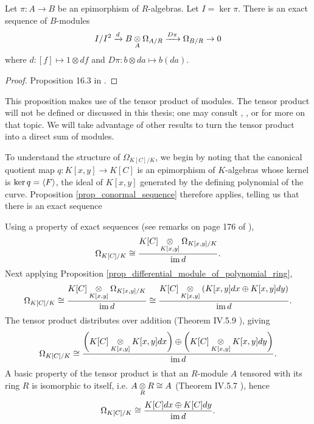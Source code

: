 \begin{proposition}
  \label{prop_conormal_sequence}
  Let $\pi : A \to B$ be an epimorphism of $R$-algebras.
  Let $I = \ker \pi$.
  There is an exact sequence of $B$-modules
    \[ I/I^2 \xrightarrow{d} B \underset{A}{\otimes} \Omega_{A/R} \xrightarrow{D\pi} \Omega_{B/R} \to 0 \]
  where $d : [f] \mapsto 1 \otimes df$ and $D\pi : b \otimes da \mapsto b(da)$.
\end{proposition}
\begin{proof}
  Proposition 16.3 in \cite{eisenbud95}.
\end{proof}

This proposition makes use of the tensor product of modules.
The tensor product will not be defined or discussed in this thesis;
one may consult \cite{dummit04}, \cite{eisenbud95}, or \cite{hungerford} for more on that topic.
We will take advantage of other results to turn the tensor product into a direct sum of modules.

To understand the structure of $\Omega_{K[C]/K}$,
we begin by noting that the canonical quotient map $q : K[x,y] \to K[C]$ is an epimorphism of $K$-algebras
whose kernel is $\ker q = \left\langle F \right\rangle$, the ideal of $K[x,y]$ generated by the defining polynomial of the curve.
Proposition \ref{prop_conormal_sequence} therefore applies, telling us that there is an exact sequence
\begin{center}
\end{center}
Using a property of exact sequences (see remarks on page 176 of \cite{hungerford}), 
\[ \Omega_{K[C]/K} \cong \frac {K[C] \underset{K[x,y]}{\otimes} \Omega_{K[x,y]/K}} {\operatorname{im} d}. \]
Next applying Proposition \ref{prop_differential_module_of_polynomial_ring},
\[ \Omega_{K[C]/K} \cong \frac {K[C] \underset{K[x,y]}{\otimes} \Omega_{K[x,y]/K}} {\operatorname{im} d}
                   \cong \frac {K[C] \underset{K[x,y]}{\otimes} (K[x,y]dx \oplus K[x,y]dy)} {\operatorname{im} d}. \]
The tensor product distributes over addition (Theorem IV.5.9 \cite{hungerford}), giving
\[ \Omega_{K[C]/K} \cong \frac {\left(K[C] \underset{K[x,y]}{\otimes} K[x,y]dx\right) \oplus
                                \left(K[C] \underset{K[x,y]}{\otimes} K[x,y]dy\right)} {\operatorname{im} d}. \]
A basic property of the tensor product is that an $R$-module $A$ tensored with its ring $R$ is isomorphic to itself,
i.e. $A \underset{R}{\otimes} R \cong A$ (Theorem IV.5.7 \cite{hungerford}), hence
\[ \Omega_{K[C]/K} \cong \frac {K[C]dx \oplus K[C]dy} {\operatorname{im} d}. \]

